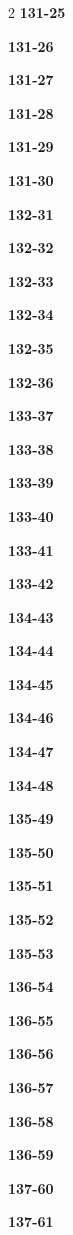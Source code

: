 \documentclass[10pt,a4paper]{article}
\begin{document}
\begin{multicols}{2}
\noindent\textbf{131-25}\ \par
\noindent\textbf{131-26}\ \par
\noindent\textbf{131-27}\ \par
\noindent\textbf{131-28}\ \par
\noindent\textbf{131-29}\ \par
\noindent\textbf{131-30}\ \par
\noindent\textbf{132-31}\ \par
\noindent\textbf{132-32}\ \par
\noindent\textbf{132-33}\ \par
\noindent\textbf{132-34}\ \par
\noindent\textbf{132-35}\ \par
\noindent\textbf{132-36}\ \par
\noindent\textbf{133-37}\ \par
\noindent\textbf{133-38}\ \par
\noindent\textbf{133-39}\ \par
\noindent\textbf{133-40}\ \par
\noindent\textbf{133-41}\ \par
\noindent\textbf{133-42}\ \par
\noindent\textbf{134-43}\ \par
\noindent\textbf{134-44}\ \par
\noindent\textbf{134-45}\ \par
\noindent\textbf{134-46}\ \par
\noindent\textbf{134-47}\ \par
\noindent\textbf{134-48}\ \par
\noindent\textbf{135-49}\ \par
\noindent\textbf{135-50}\ \par
\noindent\textbf{135-51}\ \par
\noindent\textbf{135-52}\ \par
\noindent\textbf{135-53}\ \par
\noindent\textbf{136-54}\ \par
\noindent\textbf{136-55}\ \par
\noindent\textbf{136-56}\ \par
\noindent\textbf{136-57}\ \par
\noindent\textbf{136-58}\ \par
\noindent\textbf{136-59}\ \par
\noindent\textbf{137-60}\ \par
\noindent\textbf{137-61}\ \par

\end{multicols}
\end{document}
